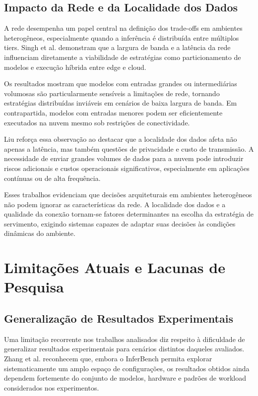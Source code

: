 \subsection{Impacto da Rede e da Localidade dos Dados}
A rede desempenha um papel central na definição dos trade-offs em ambientes heterogêneos, especialmente quando a inferência é distribuída entre múltiplos tiers. Singh et al. demonstram que a largura de banda e a latência da rede influenciam diretamente a viabilidade de estratégias como particionamento de modelos e execução híbrida entre edge e cloud.

Os resultados mostram que modelos com entradas grandes ou intermediárias volumosas são particularmente sensíveis a limitações de rede, tornando estratégias distribuídas inviáveis em cenários de baixa largura de banda. Em contrapartida, modelos com entradas menores podem ser eficientemente executados na nuvem mesmo sob restrições de conectividade.

Liu reforça essa observação ao destacar que a localidade dos dados afeta não apenas a latência, mas também questões de privacidade e custo de transmissão. A necessidade de enviar grandes volumes de dados para a nuvem pode introduzir riscos adicionais e custos operacionais significativos, especialmente em aplicações contínuas ou de alta frequência.

Esses trabalhos evidenciam que decisões arquiteturais em ambientes heterogêneos não podem ignorar as características da rede. A localidade dos dados e a qualidade da conexão tornam-se fatores determinantes na escolha da estratégia de servimento, exigindo sistemas capazes de adaptar suas decisões às condições dinâmicas do ambiente.

\section{Limitações Atuais e Lacunas de Pesquisa}
\subsection{Generalização de Resultados Experimentais}
Uma limitação recorrente nos trabalhos analisados diz respeito à dificuldade de generalizar resultados experimentais para cenários distintos daqueles avaliados. Zhang et al. reconhecem que, embora o InferBench permita explorar sistematicamente um amplo espaço de configurações, os resultados obtidos ainda dependem fortemente do conjunto de modelos, hardware e padrões de workload considerados nos experimentos.

